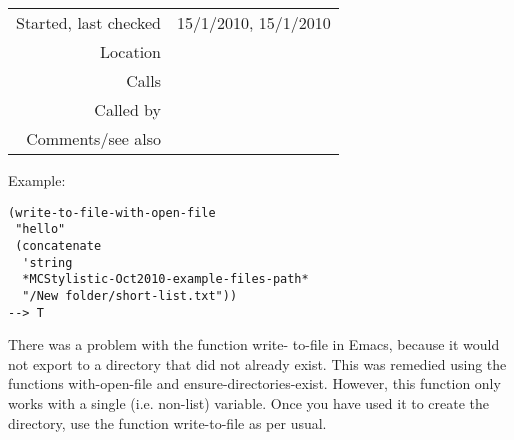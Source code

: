 \vspace{0.3cm}
\begin{tabular}{r|p{8cm}}
Started, last checked & 15/1/2010, 15/1/2010 \\
Location & \nameref{sec:text-files} \\
Calls & \\
Called by & \\
Comments/see also &
\end{tabular}

\vspace{0.5cm}
\noindent Example:
\begin{verbatim}
(write-to-file-with-open-file
 "hello"
 (concatenate
  'string
  *MCStylistic-Oct2010-example-files-path*
  "/New folder/short-list.txt"))
--> T
\end{verbatim}

\noindent There was a problem with the function write-
to-file in Emacs, because it would not export to a
directory that did not already exist. This was
remedied using the functions with-open-file and
ensure-directories-exist. However, this function
only works with a single (i.e. non-list) variable.
Once you have used it to create the directory, use
the function write-to-file as per usual.





















